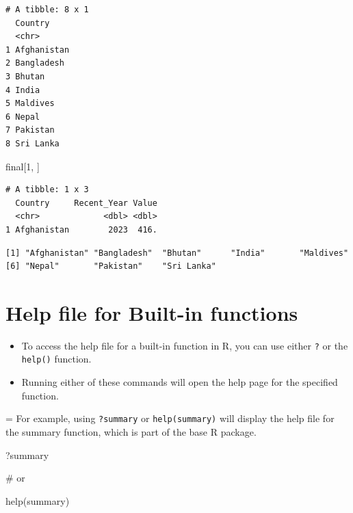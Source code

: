 \documentclass[
  letterpaper,
  DIV=11,
  numbers=noendperiod]{scrreprt}
\newenvironment{Shaded}{\begin{snugshade}}{\end{snugshade}}
\newcommand{\CommentTok}[1]{\textcolor[rgb]{0.37,0.37,0.37}{#1}}
\newcommand{\DecValTok}[1]{\textcolor[rgb]{0.68,0.00,0.00}{#1}}
\newcommand{\FunctionTok}[1]{\textcolor[rgb]{0.28,0.35,0.67}{#1}}
\newcommand{\NormalTok}[1]{\textcolor[rgb]{0.00,0.23,0.31}{#1}}
\newcommand{\SpecialCharTok}[1]{\textcolor[rgb]{0.37,0.37,0.37}{#1}}
\begin{document}
\begin{verbatim}
# A tibble: 8 x 1
  Country    
  <chr>      
1 Afghanistan
2 Bangladesh 
3 Bhutan     
4 India      
5 Maldives   
6 Nepal      
7 Pakistan   
8 Sri Lanka  
\end{verbatim}

\begin{Shaded}
\begin{Highlighting}[]
\NormalTok{final[}\DecValTok{1}\NormalTok{, ]}
\end{Highlighting}
\end{Shaded}

\begin{verbatim}
# A tibble: 1 x 3
  Country     Recent_Year Value
  <chr>             <dbl> <dbl>
1 Afghanistan        2023  416.
\end{verbatim}

\begin{Shaded}
\end{Shaded}

\begin{verbatim}
[1] "Afghanistan" "Bangladesh"  "Bhutan"      "India"       "Maldives"   
[6] "Nepal"       "Pakistan"    "Sri Lanka"  
\end{verbatim}

\section{Help file for Built-in
functions}\label{help-file-for-built-in-functions}

\begin{itemize}
\item
  To access the help file for a built-in function in R, you can use
  either \texttt{?} or the \texttt{help()} function.
\item
  Running either of these commands will open the help page for the
  specified function.
\end{itemize}

= For example, using \texttt{?summary} or \texttt{help(summary)} will
display the help file for the summary function, which is part of the
base R package.

\begin{Shaded}
\begin{Highlighting}[]
\NormalTok{?summary}

\CommentTok{\# or }

\FunctionTok{help}\NormalTok{(summary)}
\end{Highlighting}
\end{Shaded}
\end{document}
